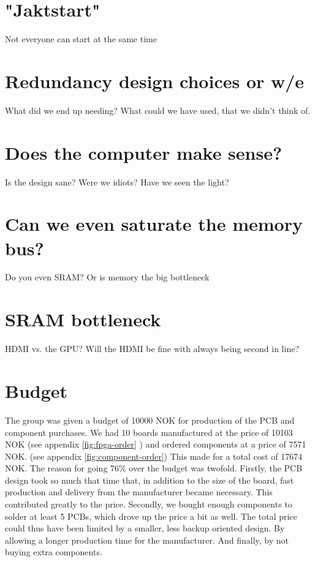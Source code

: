 \documentclass[../main/report.tex]{subfiles}
\begin{document}


\section{"Jaktstart"}

Not everyone can start at the same time

\section{Redundancy design choices or w/e}
What did we end up needing?
What could we have used, that we didn't think of.

\section{Does the computer make sense?}
Is the design sane?
Were we idiots?
Have we seen the light?

\section{Can we even saturate the memory bus?}
Do you even SRAM?
Or is memory the big bottleneck

\section{SRAM bottleneck}
HDMI vs. the GPU?
Will the HDMI be fine with always being second in line?

\section{Budget}
The group was given a budget of 10000 NOK for production of the PCB and component purchases. 
We had 10 boards manufactured at the price of 10103 NOK (see appendix \ref{fig:fpga-order} ) and ordered components at a price of 7571 NOK. (see appendix \ref{fig:component-order}) 
This made for a total cost of 17674 NOK.
The reason for going 76\% over the budget was twofold. Firstly, the PCB design took so much that time that, in addition to the size of the board, fast production and delivery from the manufacturer became necessary. 
This contributed greatly to the price.
Secondly, we bought enough components to solder at least 5 PCBs, which drove up the price a bit as well.
The total price could thus have been limited by a smaller, less backup oriented design. 
By allowing a longer production time for the manufacturer.
And finally, by not buying extra components.
\end{document}
